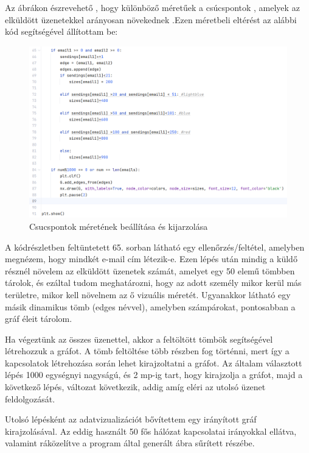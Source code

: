 Az ábrákon észrevehető , hogy különböző méretűek a csúcspontok , amelyek az elküldött üzenetekkel arányosan növekednek .Ezen méretbeli eltérést az alábbi kód segítségével állítottam be:
\begin{figure}[h]
    \centering
    \includegraphics[scale=0.5]{images/vizualizacioskod}
    \caption{Csucspontok méretének beállítása és kijarzolása}
    \label{fig:enter-label}
\end{figure}

A kódrészletben feltüntetett 65. sorban látható egy ellenőrzés/feltétel, amelyben megnézem, hogy mindkét e-mail cím létezik-e. Ezen lépés után mindig a küldő résznél növelem az elküldött üzenetek számát, amelyet egy 50 elemű tömbben tárolok, és ezáltal tudom meghatározni, hogy az adott személy mikor kerül más területre, mikor kell növelnem az ő vizuális méretét. Ugyanakkor látható egy másik dinamikus tömb (edges névvel), amelyben számpárokat, pontosabban a gráf éleit tárolom.

Ha végeztünk az összes üzenettel, akkor a feltöltött tömbök segítségével létrehozzuk a gráfot. A tömb feltöltése több részben fog történni, mert így a kapcsolatok létrehozása során lehet kirajzoltatni a gráfot. Az általam választott lépés 1000 egységnyi nagyságú, és 2 mp-ig tart, hogy kirajzolja a gráfot, majd a következő lépés, változat következik, addig amíg eléri az utolsó üzenet feldolgozását.

Utolsó lépésként az adatvizualizációt bővítettem egy irányított gráf kirajzolásával. Az eddig használt 50 fős hálózat kapcsolatai irányokkal ellátva, valamint ráközelítve a program által generált ábra sűrített részébe.

